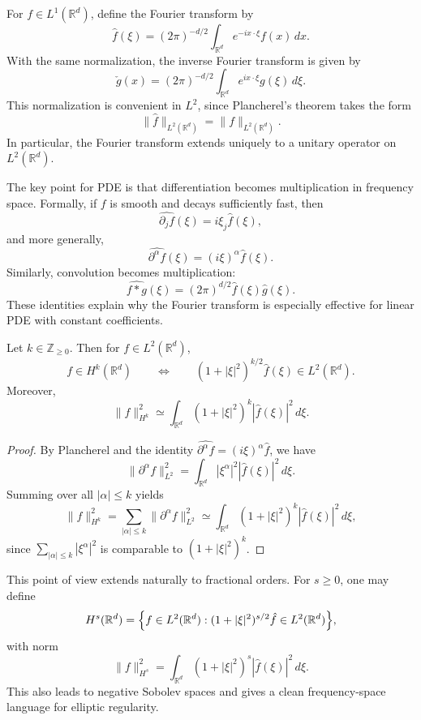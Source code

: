 For $f\in L^1(\mathbb{R}^d)$, define the Fourier transform by
\[
\hat f(\xi) = (2\pi)^{-d/2}\int_{\mathbb{R}^d} e^{-ix\cdot \xi}f(x)\,dx.
\]
With the same normalization, the inverse Fourier transform is given by
\[
\check g(x) = (2\pi)^{-d/2}\int_{\mathbb{R}^d} e^{ix\cdot \xi}g(\xi)\,d\xi.
\]
This normalization is convenient in $L^2$, since Plancherel's theorem takes the form
\[
\|\hat f\|_{L^2(\mathbb{R}^d)} = \|f\|_{L^2(\mathbb{R}^d)}.
\]
In particular, the Fourier transform extends uniquely to a unitary operator on $L^2(\mathbb{R}^d)$.

The key point for PDE is that differentiation becomes multiplication in frequency space. Formally, if $f$ is smooth and decays sufficiently fast, then
\[
\widehat{\partial_j f}(\xi) = i\xi_j\hat f(\xi),
\]
and more generally,
\[
\widehat{\partial^{\alpha}f}(\xi) = (i\xi)^{\alpha}\hat f(\xi).
\]
Similarly, convolution becomes multiplication:
\[
\widehat{f*g}(\xi) = (2\pi)^{d/2}\hat f(\xi)\hat g(\xi).
\]
These identities explain why the Fourier transform is especially effective for linear PDE with constant coefficients.

\begin{proposition}
Let $k\in \mathbb{Z}_{\ge 0}$. Then for $f\in L^2(\mathbb{R}^d)$,
\[
f\in H^k(\mathbb{R}^d)
\qquad \Longleftrightarrow \qquad
(1+|\xi|^2)^{k/2}\hat f(\xi)\in L^2(\mathbb{R}^d).
\]
Moreover,
\[
\|f\|_{H^k}^2 \simeq \int_{\mathbb{R}^d}(1+|\xi|^2)^k|\hat f(\xi)|^2\,d\xi.
\]
\end{proposition}

\begin{proof}
By Plancherel and the identity $\widehat{\partial^{\alpha}f}=(i\xi)^{\alpha}\hat f$, we have
\[
\|\partial^{\alpha}f\|_{L^2}^2 = \int_{\mathbb{R}^d}|\xi^{\alpha}|^2|\hat f(\xi)|^2\,d\xi.
\]
Summing over all $|\alpha|\le k$ yields
\[
\|f\|_{H^k}^2
= \sum_{|\alpha|\le k}\|\partial^{\alpha}f\|_{L^2}^2
\simeq \int_{\mathbb{R}^d}(1+|\xi|^2)^k|\hat f(\xi)|^2\,d\xi,
\]
since $\sum_{|\alpha|\le k}|\xi^{\alpha}|^2$ is comparable to $(1+|\xi|^2)^k$.
\end{proof}

\begin{remark}
This point of view extends naturally to fractional orders. For $s\ge 0$, one may define
\[
H^s(\mathbb{R}^d)=\Bigl\{f\in L^2(\mathbb{R}^d):(1+|\xi|^2)^{s/2}\hat f\in L^2(\mathbb{R}^d)\Bigr\},
\]
with norm
\[
\|f\|_{H^s}^2 = \int_{\mathbb{R}^d}(1+|\xi|^2)^s|\hat f(\xi)|^2\,d\xi.
\]
This also leads to negative Sobolev spaces and gives a clean frequency-space language for elliptic regularity.
\end{remark}

